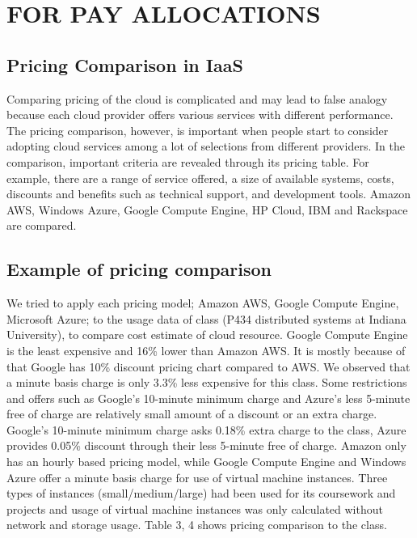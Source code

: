 \documentclass{sig-alternate}
\begin{document}
\section{FOR PAY ALLOCATIONS}

\subsection{Pricing Comparison in IaaS}

Comparing pricing of the cloud is complicated and may lead to false analogy because each cloud provider offers various services with different performance. The pricing comparison, however, is important when people start to consider adopting cloud services among a lot of selections from different providers. In the comparison, important criteria are revealed through its pricing table. For example, there are a range of service offered, a size of available systems, costs, discounts and benefits such as technical support, and development tools. Amazon AWS, Windows Azure, Google Compute Engine, HP Cloud, IBM and Rackspace are compared.

\subsection{Example of pricing comparison}

We tried to apply each pricing model; Amazon AWS, Google Compute Engine, Microsoft Azure; to the usage data of class (P434 distributed systems at Indiana University), to compare cost estimate of cloud resource. Google Compute Engine is the least expensive and 16\% lower than Amazon AWS. It is mostly because of that Google has 10\% discount pricing chart compared to AWS. We observed that a minute basis charge is only 3.3\% less expensive for this class. Some restrictions and offers such as Google's 10-minute minimum charge and Azure's less 5-minute free of charge are relatively small amount of a discount or an extra charge. Google's 10-minute minimum charge asks 0.18\% extra charge to the class, Azure provides 0.05\% discount through their less 5-minute free of charge. Amazon only has an hourly based pricing model, while Google Compute Engine and Windows Azure offer a minute basis charge for use of virtual machine instances. Three types of instances (small/medium/large) had been used for its coursework and projects and usage of virtual machine instances was only calculated without network and storage usage. Table 3, 4 shows pricing comparison to the class.
\end{document}
